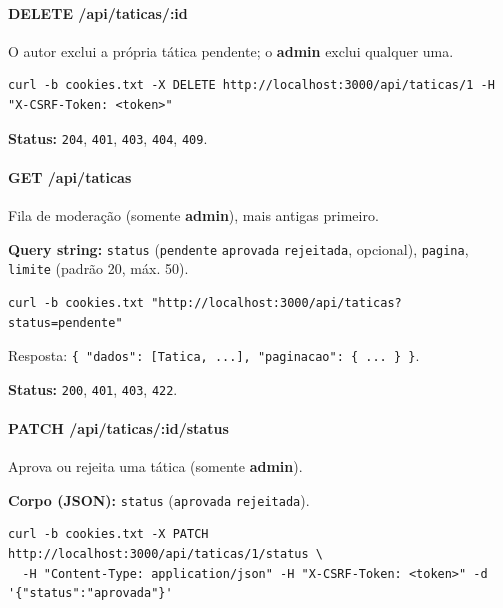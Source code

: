 \hypertarget{delete-apitaticasid}{%
\paragraph{DELETE /api/taticas/:id}\label{delete-apitaticasid}}

O autor exclui a própria tática pendente; o \textbf{admin} exclui
qualquer uma.

\begin{Verbatim}[breaklines,breakanywhere,fontsize=\scriptsize]
curl -b cookies.txt -X DELETE http://localhost:3000/api/taticas/1 -H "X-CSRF-Token: <token>"
\end{Verbatim}

\textbf{Status:} \texttt{204}, \texttt{401}, \texttt{403}, \texttt{404},
\texttt{409}.

\hypertarget{get-apitaticas}{%
\paragraph{GET /api/taticas}\label{get-apitaticas}}

Fila de moderação (somente \textbf{admin}), mais antigas primeiro.

\textbf{Query string:} \texttt{status} (\texttt{pendente} \textbar{}
\texttt{aprovada} \textbar{} \texttt{rejeitada}, opcional),
\texttt{pagina}, \texttt{limite} (padrão 20, máx. 50).

\begin{Verbatim}[breaklines,breakanywhere,fontsize=\scriptsize]
curl -b cookies.txt "http://localhost:3000/api/taticas?status=pendente"
\end{Verbatim}

Resposta:
\texttt{\{\ "dados":\ {[}Tatica,\ ...{]},\ "paginacao":\ \{\ ...\ \}\ \}}.

\textbf{Status:} \texttt{200}, \texttt{401}, \texttt{403}, \texttt{422}.

\hypertarget{patch-apitaticasidstatus}{%
\paragraph{PATCH
/api/taticas/:id/status}\label{patch-apitaticasidstatus}}

Aprova ou rejeita uma tática (somente \textbf{admin}).

\textbf{Corpo (JSON):} \texttt{status} (\texttt{aprovada} \textbar{}
\texttt{rejeitada}).

\begin{Verbatim}[breaklines,breakanywhere,fontsize=\scriptsize]
curl -b cookies.txt -X PATCH http://localhost:3000/api/taticas/1/status \
  -H "Content-Type: application/json" -H "X-CSRF-Token: <token>" -d '{"status":"aprovada"}'
\end{Verbatim}

